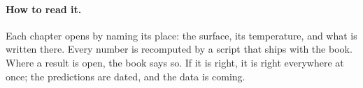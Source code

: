 \paragraph{How to read it.} Each chapter opens by naming its place: the surface, its temperature, and what is written there. Every number is
recomputed by a script that ships with the book. Where a result is open, the book says so. If it is right, it is right everywhere at once;
the predictions are dated, and the data is coming.
